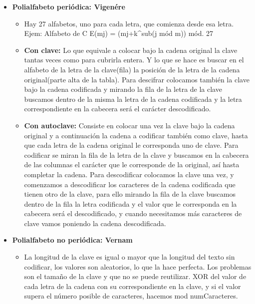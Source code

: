 \documentclass[12pt, twoside, openright]{report} %
\begin{document}
\begin{itemize}
\begin{itemize}
\begin{itemize}
      \end{itemize}
    \item \textbf{Polialfabeto periódica: Vigenére}
      

      \begin{itemize}
      \item Hay 27 alfabetos, uno para cada letra, que comienza desde esa
        letra. Ejem: Alfabeto de C E(mj) = (mj+k\^{}sub(j mód m)) mód.
        27
        
      \item \textbf{Con clave:} Lo que equivale a colocar bajo la cadena
        original la clave tantas veces como para cubrirla entera. Y lo
        que se hace es buscar en el alfabeto de la letra de la
        clave(fila) la posición de la letra de la cadena original(parte
        alta de la tabla). Para descifrar colocamos también la clave
        bajo la cadena codificada y mirando la fila de la letra de la
        clave buscamos dentro de la misma la letra de la cadena
        codificada y la letra correspondiente en la cabecera será el
        carácter descodificado.
        
      \item \textbf{Con autoclave:} Consiste en colocar una vez la clave
        bajo la cadena original y a continuación la cadena a codificar
        también como clave, hasta que cada letra de la cadena original
        le corresponda uno de clave. Para codificar se miran la fila de
        la letra de la clave y buscamos en la cabecera de las columnas
        el carácter que le corresponde de la original, así hasta
        completar la cadena. Para descodificar colocamos la clave una
        vez, y comenzamos a descodificar los caracteres de la cadena
        codificada que tienen otro de la clave, para ello mirando la
        fila de la clave buscamos dentro de la fila la letra codificada
        y el valor que le corresponda en la cabecera será el
        descodificado, y cuando necesitamos más caracteres de clave
        vamos poniendo la cadena descodificada.
        
      \end{itemize}
    \item \textbf{Polialfabeto no periódica: Vernam}
      

      \begin{itemize}
      \item La longitud de la clave es igual o mayor que la longitud del
        texto sin codificar, los valores son aleatorios, lo que la hace
        perfecta. Los problemas son el tamaño de la clave y que no se
        puede reutilizar. XOR del valor de cada letra de la cadena con
        su correspondiente en la clave, y si el valor supera el número
        posible de caracteres, hacemos mod numCaracteres.
        

\end{itemize}
\end{itemize}
\end{itemize}
\end{document}
